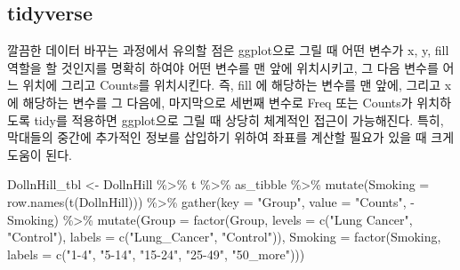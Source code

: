 \documentclass[
]{article}
\newenvironment{Shaded}{\begin{snugshade}}{\end{snugshade}}
\newcommand{\AttributeTok}[1]{\textcolor[rgb]{0.77,0.63,0.00}{#1}}
\newcommand{\FunctionTok}[1]{\textcolor[rgb]{0.00,0.00,0.00}{#1}}
\newcommand{\NormalTok}[1]{#1}
\newcommand{\OtherTok}[1]{\textcolor[rgb]{0.56,0.35,0.01}{#1}}
\newcommand{\SpecialCharTok}[1]{\textcolor[rgb]{0.00,0.00,0.00}{#1}}
\newcommand{\StringTok}[1]{\textcolor[rgb]{0.31,0.60,0.02}{#1}}
\begin{document}
\hypertarget{tidyverse}{%
\subsection{tidyverse}\label{tidyverse}}

깔끔한 데이터 바꾸는 과정에서 유의할 점은 ggplot으로 그릴 때 어떤 변수가
x, y, fill 역할을 할 것인지를 명확히 하여야 어떤 변수를 맨 앞에
위치시키고, 그 다음 변수를 어느 위치에 그리고 Counts를 위치시킨다. 즉,
fill 에 해당하는 변수를 맨 앞에, 그리고 x에 해당하는 변수를 그 다음에,
마지막으로 세번째 변수로 Freq 또는 Counts가 위치하도록 tidy를 적용하면
ggplot으로 그릴 때 상당히 체계적인 접근이 가능해진다. 특히, 막대들의
중간에 추가적인 정보를 삽입하기 위하여 좌표를 계산할 필요가 있을 때 크게
도움이 된다.

\begin{Shaded}
\begin{Highlighting}[]
\NormalTok{DollnHill\_tbl }\OtherTok{\textless{}{-}}\NormalTok{ DollnHill }\SpecialCharTok{\%\textgreater{}\%}
\NormalTok{  t }\SpecialCharTok{\%\textgreater{}\%}
\NormalTok{  as\_tibble }\SpecialCharTok{\%\textgreater{}\%}
  \FunctionTok{mutate}\NormalTok{(}\AttributeTok{Smoking =} \FunctionTok{row.names}\NormalTok{(}\FunctionTok{t}\NormalTok{(DollnHill))) }\SpecialCharTok{\%\textgreater{}\%}
  \FunctionTok{gather}\NormalTok{(}\AttributeTok{key =} \StringTok{"Group"}\NormalTok{, }\AttributeTok{value =} \StringTok{"Counts"}\NormalTok{, }\SpecialCharTok{{-}}\NormalTok{Smoking) }\SpecialCharTok{\%\textgreater{}\%}
  \FunctionTok{mutate}\NormalTok{(}\AttributeTok{Group =} \FunctionTok{factor}\NormalTok{(Group, }
                        \AttributeTok{levels =} \FunctionTok{c}\NormalTok{(}\StringTok{"Lung Cancer"}\NormalTok{, }\StringTok{"Control"}\NormalTok{), }
                        \AttributeTok{labels =} \FunctionTok{c}\NormalTok{(}\StringTok{"Lung\_Cancer"}\NormalTok{, }\StringTok{"Control"}\NormalTok{)),}
         \AttributeTok{Smoking =} \FunctionTok{factor}\NormalTok{(Smoking, }
                          \AttributeTok{labels =} \FunctionTok{c}\NormalTok{(}\StringTok{"1{-}4"}\NormalTok{, }
                                     \StringTok{"5{-}14"}\NormalTok{, }
                                     \StringTok{"15{-}24"}\NormalTok{, }
                                     \StringTok{"25{-}49"}\NormalTok{, }
                                     \StringTok{"50\_more"}\NormalTok{)))}
\end{Highlighting}
\end{Shaded}
\end{document}

